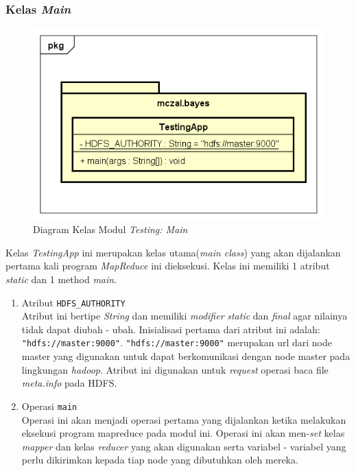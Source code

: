 \subsubsection{Kelas \textit{Main}}
\begin{figure}[H]
	\centering
	\includegraphics[scale=0.7]{ClassDiagramLengkap/CD_Test_Main}
	\caption[Diagram Kelas Modul \textit{Testing: Main}]{Diagram Kelas Modul \textit{Testing: Main}}
	\label{fig:Diagram Kelas Modul Testing: Main}
\end{figure}
	Kelas \textit{TestingApp} ini merupakan kelas utama(\textit{main class}) yang akan dijalankan pertama kali program \textit{MapReduce} ini dieksekusi. Kelas ini memiliki 1 atribut \textit{static} dan 1 method \textit{main}.
	\begin{enumerate}
		\item Atribut \verb|HDFS_AUTHORITY| \\
		Atribut ini bertipe \textit{String} dan memiliki \textit{modifier} \textit{static} dan \textit{final} agar nilainya tidak dapat diubah - ubah. Inisialisasi pertama dari atribut ini adalah: \verb|"hdfs://master:9000"|. \verb|"hdfs://master:9000"| merupakan url dari node master yang digunakan untuk dapat berkomunikasi dengan node master pada lingkungan \textit{hadoop}. Atribut ini digunakan untuk \textit{request} operasi baca file \textit{meta.info} pada HDFS.
		
		\item Operasi \verb|main|\\
		Operasi ini akan menjadi operasi pertama yang dijalankan ketika melakukan eksekusi program mapreduce pada modul ini. Operasi ini akan men-\textit{set} kelas \textit{mapper} dan kelas \textit{reducer} yang akan digunakan serta variabel - variabel yang perlu dikirimkan kepada tiap node yang dibutuhkan oleh mereka.
	\end{enumerate}


